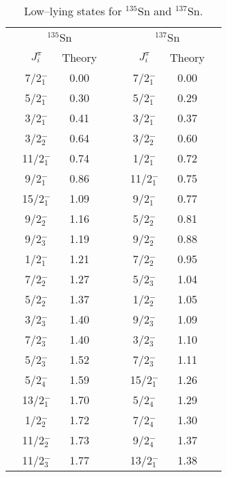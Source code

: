 \documentclass[twoside,12pt]{article}
\begin{document}
\begin{table}[htbp]
\caption{Low--lying states for  $^{135}$Sn and $^{137}$Sn.}
\label{tab:odd_isotopes}
\begin{center}
\begin{tabular}{|cccc|cccc|}
\hline
\multicolumn{4}{|c|}{ $^{135}$Sn} & \multicolumn{4}{|c|}{ $^{137}$Sn}\\
&{$J^{\pi}_i$}&  Theory&&    &{$J^{\pi}_i$}&   Theory& \\

\hline

&  7/2$_1^-$  &  0.00  &&    &  7/2$_1^-$  &   0.00&    \\
&  5/2$_1^-$  &  0.30  &&    &  5/2$_1^-$  &   0.29&    \\
&  3/2$_1^-$  &  0.41  &&    &  3/2$_1^-$  &   0.37&    \\
&  3/2$_2^-$  &  0.64  &&    &  3/2$_2^-$  &   0.60&    \\
& 11/2$_1^-$  &  0.74  &&    &  1/2$_1^-$  &   0.72&    \\
&  9/2$_1^-$  &  0.86  &&    & 11/2$_1^-$  &   0.75&    \\
& 15/2$_1^-$  &  1.09  &&    &  9/2$_1^-$  &   0.77&    \\
&  9/2$_2^-$  &  1.16  &&    &  5/2$_2^-$  &   0.81&    \\
&  9/2$_3^-$  &  1.19  &&    &  9/2$_2^-$  &   0.88&    \\
&  1/2$_1^-$  &  1.21  &&    &  7/2$_2^-$  &   0.95&    \\
&  7/2$_2^-$  &  1.27  &&    &  5/2$_3^-$  &   1.04&    \\
&  5/2$_2^-$  &  1.37  &&    &  1/2$_2^-$  &   1.05&    \\
&  3/2$_3^-$  &  1.40  &&    &  9/2$_3^-$  &   1.09&    \\
&  7/2$_3^-$  &  1.40  &&    &  3/2$_3^-$  &   1.10&    \\
&  5/2$_3^-$  &  1.52  &&    &  7/2$_3^-$  &   1.11&    \\
&  5/2$_4^-$  &  1.59  &&    & 15/2$_1^-$  &   1.26&    \\
& 13/2$_1^-$  &  1.70  &&    &  5/2$_4^-$  &   1.29&    \\
&  1/2$_2^-$  &  1.72  &&    &  7/2$_4^-$  &   1.30&    \\
& 11/2$_2^-$  &  1.73  &&    &  9/2$_4^-$  &   1.37&    \\
& 11/2$_3^-$  &  1.77  &&    & 13/2$_1^-$  &   1.38&    \\

\hline
\end{tabular}
\end{center}
\end{table}
\end{document}
